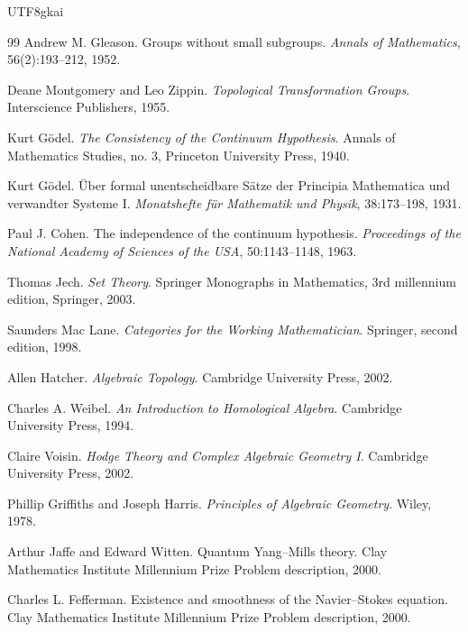 \documentclass[12pt]{article}
\begin{document}
\begin{CJK*}{UTF8}{gkai}
\begin{thebibliography}{99}
Andrew M. Gleason.
\newblock Groups without small subgroups.
\newblock \emph{Annals of Mathematics}, 56(2):193--212, 1952.

Deane Montgomery and Leo Zippin.
\newblock \emph{Topological Transformation Groups}.
\newblock Interscience Publishers, 1955.

Kurt G\"odel.
\newblock \emph{The Consistency of the Continuum Hypothesis}.
\newblock Annals of Mathematics Studies, no. 3, Princeton University Press, 1940.

Kurt G\"odel.
\newblock \"Uber formal unentscheidbare S\"atze der Principia Mathematica und verwandter Systeme I.
\newblock \emph{Monatshefte f\"ur Mathematik und Physik}, 38:173--198, 1931.

Paul J. Cohen.
\newblock The independence of the continuum hypothesis.
\newblock \emph{Proceedings of the National Academy of Sciences of the USA}, 50:1143--1148, 1963.

Thomas Jech.
\newblock \emph{Set Theory}.
\newblock Springer Monographs in Mathematics, 3rd millennium edition, Springer, 2003.

Saunders Mac Lane.
\newblock \emph{Categories for the Working Mathematician}.
\newblock Springer, second edition, 1998.

Allen Hatcher.
\newblock \emph{Algebraic Topology}.
\newblock Cambridge University Press, 2002.

Charles A. Weibel.
\newblock \emph{An Introduction to Homological Algebra}.
\newblock Cambridge University Press, 1994.

Claire Voisin.
\newblock \emph{Hodge Theory and Complex Algebraic Geometry I}.
\newblock Cambridge University Press, 2002.

Phillip Griffiths and Joseph Harris.
\newblock \emph{Principles of Algebraic Geometry}.
\newblock Wiley, 1978.

Arthur Jaffe and Edward Witten.
\newblock Quantum Yang--Mills theory.
\newblock Clay Mathematics Institute Millennium Prize Problem description, 2000.

Charles L. Fefferman.
\newblock Existence and smoothness of the Navier--Stokes equation.
\newblock Clay Mathematics Institute Millennium Prize Problem description, 2000.


\end{thebibliography}
\end{CJK*}
\end{document}
